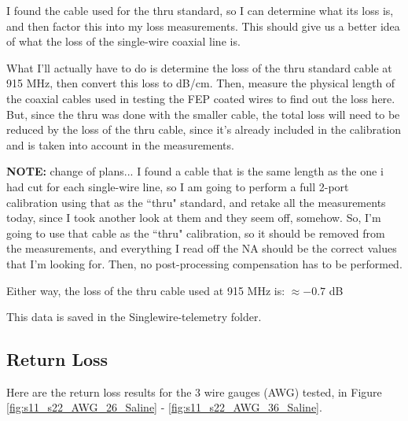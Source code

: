 \documentclass[12pt,onecolumn,titlepage]{article}
\begin{document}
I found the cable used for the thru standard, so I can determine what its loss is, and then factor this into my loss measurements. This should give us a better idea of what the loss of the single-wire coaxial line is. 

What I'll actually have to do is determine the loss of the thru standard cable at 915 MHz, then convert this loss to dB/cm. Then, measure the physical length of the coaxial cables used in testing the FEP coated wires to find out the loss here. But, since the thru was done with the smaller cable, the total loss will need to be reduced by the loss of the thru cable, since it's already included in the calibration and is taken into account in the measurements.

{\bf{NOTE:}} change of plans... I found a cable that is the same length as the one i had cut for each single-wire line, so I am going to perform a full 2-port calibration using that as the ``thru" standard, and retake all the measurements today, since I took another look at them and they seem off, somehow. So, I'm going to use that cable as the ``thru" calibration, so it should be removed from the measurements, and everything I read off the NA should be the correct values that I'm looking for. Then, no post-processing compensation has to be performed.

Either way, the loss of the thru cable used at 915 MHz is: $\approx -0.7$ dB

This data is saved in the Singlewire-telemetry folder.

\subsection{Return Loss}
\indent \indent Here are the return loss results for the 3 wire gauges (AWG) tested, in Figure \ref{fig:s11_s22_AWG_26_Saline} - \ref{fig:s11_s22_AWG_36_Saline}.
\end{document}
